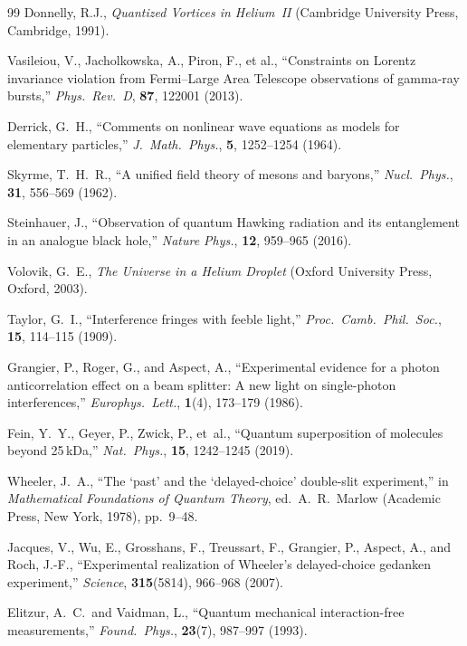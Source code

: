 ﻿\documentclass[12pt,letterpaper]{article}
\begin{document}
\begin{thebibliography}{99}
Donnelly, R.J.,
\textit{Quantized Vortices in Helium~II}
(Cambridge University Press, Cambridge, 1991).


Vasileiou, V., Jacholkowska, A., Piron, F., et al.,
``Constraints on Lorentz invariance violation from Fermi--Large Area Telescope
observations of gamma-ray bursts,''
\textit{Phys.\ Rev.\ D}, \textbf{87}, 122001 (2013).


Derrick, G.~H.,
``Comments on nonlinear wave equations as models for elementary particles,''
\textit{J.\ Math.\ Phys.}, \textbf{5}, 1252--1254 (1964).


Skyrme, T.~H.~R.,
``A unified field theory of mesons and baryons,''
\textit{Nucl.\ Phys.}, \textbf{31}, 556--569 (1962).


Steinhauer, J.,
``Observation of quantum Hawking radiation and its entanglement in an analogue black hole,''
\textit{Nature Phys.}, \textbf{12}, 959--965 (2016).


Volovik, G.~E.,
\textit{The Universe in a Helium Droplet}
(Oxford University Press, Oxford, 2003).


Taylor, G.~I.,
``Interference fringes with feeble light,''
\textit{Proc.\ Camb.\ Phil.\ Soc.}, \textbf{15}, 114--115 (1909).


Grangier, P., Roger, G., and Aspect, A.,
``Experimental evidence for a photon anticorrelation effect on a beam splitter: A new light on single-photon interferences,''
\textit{Europhys.\ Lett.}, \textbf{1}(4), 173--179 (1986).


Fein, Y.~Y., Geyer, P., Zwick, P., et~al.,
``Quantum superposition of molecules beyond 25\,kDa,''
\textit{Nat.\ Phys.}, \textbf{15}, 1242--1245 (2019).


Wheeler, J.~A.,
``The `past' and the `delayed-choice' double-slit experiment,''
in \textit{Mathematical Foundations of Quantum Theory}, ed.\ A.~R.\ Marlow
(Academic Press, New York, 1978), pp.\ 9--48.


Jacques, V., Wu, E., Grosshans, F., Treussart, F., Grangier, P., Aspect, A., and Roch, J.-F.,
``Experimental realization of Wheeler's delayed-choice gedanken experiment,''
\textit{Science}, \textbf{315}(5814), 966--968 (2007).


Elitzur, A.~C.\ and Vaidman, L.,
``Quantum mechanical interaction-free measurements,''
\textit{Found.\ Phys.}, \textbf{23}(7), 987--997 (1993).



\end{thebibliography}
\end{document}

